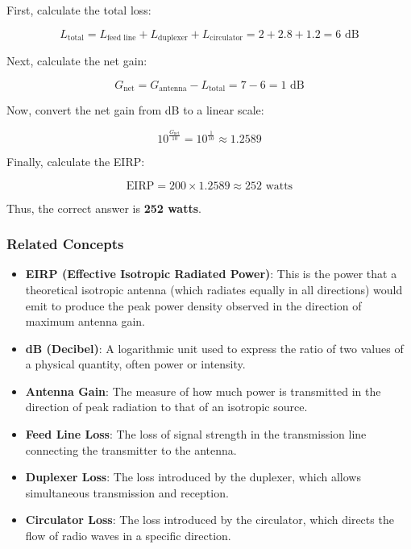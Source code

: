 First, calculate the total loss:

\[
L_{\text{total}} = L_{\text{feed line}} + L_{\text{duplexer}} + L_{\text{circulator}} = 2 + 2.8 + 1.2 = 6 \text{ dB}
\]

Next, calculate the net gain:

\[
G_{\text{net}} = G_{\text{antenna}} - L_{\text{total}} = 7 - 6 = 1 \text{ dB}
\]

Now, convert the net gain from dB to a linear scale:

\[
10^{\frac{G_{\text{net}}}{10}} = 10^{\frac{1}{10}} \approx 1.2589
\]

Finally, calculate the EIRP:

\[
\text{EIRP} = 200 \times 1.2589 \approx 252 \text{ watts}
\]

Thus, the correct answer is \textbf{252 watts}.

\subsubsection*{Related Concepts}
\begin{itemize}
    \item \textbf{EIRP (Effective Isotropic Radiated Power)}: This is the power that a theoretical isotropic antenna (which radiates equally in all directions) would emit to produce the peak power density observed in the direction of maximum antenna gain.
    \item \textbf{dB (Decibel)}: A logarithmic unit used to express the ratio of two values of a physical quantity, often power or intensity.
    \item \textbf{Antenna Gain}: The measure of how much power is transmitted in the direction of peak radiation to that of an isotropic source.
    \item \textbf{Feed Line Loss}: The loss of signal strength in the transmission line connecting the transmitter to the antenna.
    \item \textbf{Duplexer Loss}: The loss introduced by the duplexer, which allows simultaneous transmission and reception.
    \item \textbf{Circulator Loss}: The loss introduced by the circulator, which directs the flow of radio waves in a specific direction.
\end{itemize}

